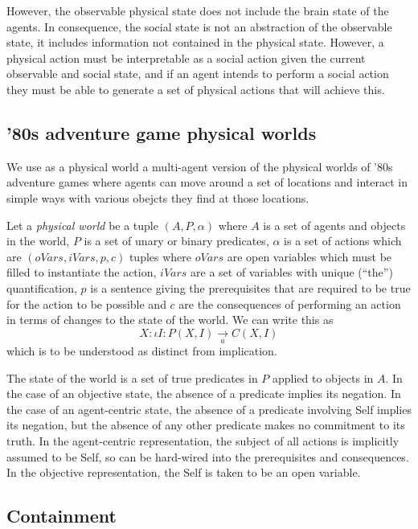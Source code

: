 \documentclass[a4paper]{article}
\begin{document}
However, the observable physical state does not include the brain state of the agents. In consequence, the social state is not an abstraction of the observable state, it includes information not contained in the physical state. However, a physical action must be interpretable as a social action given the current observable and social state, and if an agent intends to perform a social action they must be able to generate a set of physical actions that will achieve this.

\subsection{'80s adventure game physical worlds}

We use as a physical world a multi-agent version of the physical worlds of '80s adventure games where agents can move around a set of locations and interact in simple ways with various obejcts they find at those locations.

Let a \textit{physical world} be a tuple $(A,P,\alpha)$ where $A$ is a set of agents and objects in the world, $P$ is a set of unary or binary predicates, $\alpha$ is a set of actions which are $(oVars,iVars,p,c)$ tuples where $oVars$ are open variables which must be filled to instantiate the action, $iVars$ are a set of variables with unique (``the'') quantification, $p$ is a sentence giving the prerequisites that are required to be true for the action to be possible and $c$ are the consequences of performing an action in terms of changes to the state of the world. We can write this as
\[
X: \iota I: P(X,I) \underset{a}{\to} C(X,I)
\]
which is to be understood as distinct from implication.

The state of the world is a set of true predicates in $P$ applied to objects in $A$. In the case of an objective state, the absence of a predicate implies its negation. In the case of an agent-centric state, the absence of a predicate involving Self implies its negation, but the absence of any other predicate makes no commitment to its truth. In the agent-centric representation, the subject of all actions is implicitly assumed to be Self, so can be hard-wired into the prerequisites and consequences. In the objective representation, the Self is taken to be an open variable.

\subsection{Containment}
\end{document}
